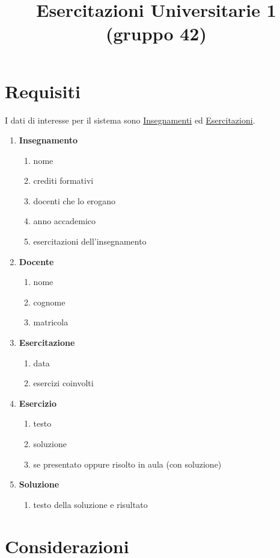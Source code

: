 \documentclass[12pt, letterpaper]{article}
\title{Esercitazioni Universitarie 1 (gruppo 42)}
\date{}
\begin{document}
\maketitle


\section{Requisiti}
I dati di interesse per il sistema sono \underline{Insegnamenti} ed \underline{Esercitazioni}.
\begin{enumerate}
    \item \textbf{Insegnamento}\begin{enumerate}
        \item nome 
        \item crediti formativi
        \item docenti che lo erogano
        \item anno accademico
        \item esercitazioni dell'insegnamento
    \end{enumerate}
    \item \textbf{Docente}\begin{enumerate}
        \item nome 
        \item cognome 
        \item matricola
    \end{enumerate}
    \item\textbf{Esercitazione}\begin{enumerate}
        \item data
        \item esercizi coinvolti
    \end{enumerate}
    \item \textbf{Esercizio}\begin{enumerate}
        \item testo 
        \item soluzione 
        \item se presentato oppure risolto in aula (con soluzione)
    \end{enumerate}
    \item \textbf{Soluzione}\begin{enumerate}
        \item testo della soluzione e risultato
    \end{enumerate}
\end{enumerate}
\newpage
\section{Considerazioni}
\end{document}
